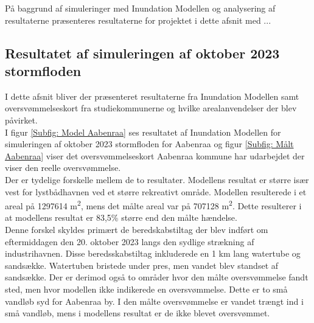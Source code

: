 
På baggrund af simuleringer med Inundation Modellen og analysering af resultaterne præsenteres resultaterne for projektet i dette afsnit med ...

\subsection{Resultatet af simuleringen af oktober 2023 stormfloden}
I dette afsnit bliver der præsenteret resultaterne fra Inundation Modellen samt oversvømmelseskort fra studiekommunerne og hvilke arealanvendelser der blev påvirket.\\

I figur \ref{Subfig: Model Aabenraa} ses resultatet af Inundation Modellen for simuleringen af oktober 2023 stormfloden for Aabenraa og figur \ref{Subfig: Målt Aabenraa} viser det oversvømmelseskort Aabenraa kommune har udarbejdet der viser den reelle oversvømmelse. \\
Der er tydelige forskelle mellem de to resultater. Modellens resultat er større især vest for lystbådhavnen ved et større rekreativt område. Modellen resulterede i et areal på 1297614 m\textsuperscript{2}, mens det målte areal var på 707128 m\textsuperscript{2}. Dette resulterer i at modellens resultat er 83,5\% større end den målte hændelse. \\
Denne forskel skyldes primært de beredskabstiltag der blev indført om eftermiddagen den 20. oktober 2023 langs den sydlige strækning af industrihavnen. Disse beredsskabstiltag inkluderede en 1 km lang watertube og sandsække. Watertuben bristede under pres, men vandet blev standset af sandsække. 
Der er derimod også to områder hvor den målte oversvømmelse fandt sted, men hvor modellen ikke indikerede en oversvømmelse. Dette er to små vandløb syd for Aabenraa by. I den målte oversvømmelse er vandet trængt ind i små vandløb, mens i modellens resultat er de ikke blevet oversvømmet.    
